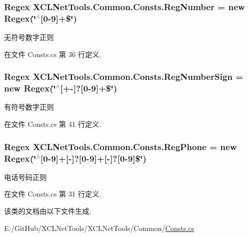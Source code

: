 \subsubsection[{\texorpdfstring{Reg\+Number}{RegNumber}}]{\setlength{\rightskip}{0pt plus 5cm}Regex X\+C\+L\+Net\+Tools.\+Common.\+Consts.\+Reg\+Number = new Regex(\char`\"{}$^\wedge$\mbox{[}0-\/9\mbox{]}+\$\char`\"{})\hspace{0.3cm}{\ttfamily [static]}}\hypertarget{class_x_c_l_net_tools_1_1_common_1_1_consts_a77b7430f7b6be306f3168d8f954803ec}{}\label{class_x_c_l_net_tools_1_1_common_1_1_consts_a77b7430f7b6be306f3168d8f954803ec}


无符号数字正则 



在文件 Consts.\+cs 第 36 行定义.

\subsubsection[{\texorpdfstring{Reg\+Number\+Sign}{RegNumberSign}}]{\setlength{\rightskip}{0pt plus 5cm}Regex X\+C\+L\+Net\+Tools.\+Common.\+Consts.\+Reg\+Number\+Sign = new Regex(\char`\"{}$^\wedge$\mbox{[}+-\/\mbox{]}?\mbox{[}0-\/9\mbox{]}+\$\char`\"{})\hspace{0.3cm}{\ttfamily [static]}}\hypertarget{class_x_c_l_net_tools_1_1_common_1_1_consts_aaa6eaa871d664473d2e6d189c825f177}{}\label{class_x_c_l_net_tools_1_1_common_1_1_consts_aaa6eaa871d664473d2e6d189c825f177}


有符号数字正则 



在文件 Consts.\+cs 第 41 行定义.

\subsubsection[{\texorpdfstring{Reg\+Phone}{RegPhone}}]{\setlength{\rightskip}{0pt plus 5cm}Regex X\+C\+L\+Net\+Tools.\+Common.\+Consts.\+Reg\+Phone = new Regex(\char`\"{}$^\wedge$\mbox{[}0-\/9\mbox{]}+\mbox{[}-\/\mbox{]}?\mbox{[}0-\/9\mbox{]}+\mbox{[}-\/\mbox{]}?\mbox{[}0-\/9\mbox{]}\$\char`\"{})\hspace{0.3cm}{\ttfamily [static]}}\hypertarget{class_x_c_l_net_tools_1_1_common_1_1_consts_a88185aad823255cb7bf15a88d8ef55de}{}\label{class_x_c_l_net_tools_1_1_common_1_1_consts_a88185aad823255cb7bf15a88d8ef55de}


电话号码正则 



在文件 Consts.\+cs 第 31 行定义.



该类的文档由以下文件生成\+:\begin{DoxyCompactItemize}
\item 
E\+:/\+Git\+Hub/\+X\+C\+L\+Net\+Tools/\+X\+C\+L\+Net\+Tools/\+Common/\hyperlink{_consts_8cs}{Consts.\+cs}\end{DoxyCompactItemize}
